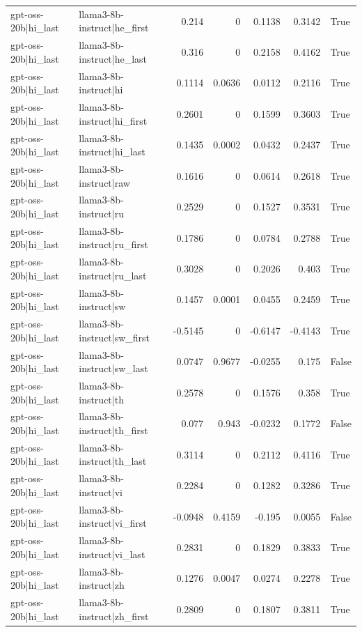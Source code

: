 \begin{table}
\begin{tabular}{l l r r r r l}
gpt-oss-20b|hi_last & llama3-8b-instruct|he_first & 0.214 & 0 & 0.1138 & 0.3142 & True \\
gpt-oss-20b|hi_last & llama3-8b-instruct|he_last & 0.316 & 0 & 0.2158 & 0.4162 & True \\
gpt-oss-20b|hi_last & llama3-8b-instruct|hi & 0.1114 & 0.0636 & 0.0112 & 0.2116 & True \\
gpt-oss-20b|hi_last & llama3-8b-instruct|hi_first & 0.2601 & 0 & 0.1599 & 0.3603 & True \\
gpt-oss-20b|hi_last & llama3-8b-instruct|hi_last & 0.1435 & 0.0002 & 0.0432 & 0.2437 & True \\
gpt-oss-20b|hi_last & llama3-8b-instruct|raw & 0.1616 & 0 & 0.0614 & 0.2618 & True \\
gpt-oss-20b|hi_last & llama3-8b-instruct|ru & 0.2529 & 0 & 0.1527 & 0.3531 & True \\
gpt-oss-20b|hi_last & llama3-8b-instruct|ru_first & 0.1786 & 0 & 0.0784 & 0.2788 & True \\
gpt-oss-20b|hi_last & llama3-8b-instruct|ru_last & 0.3028 & 0 & 0.2026 & 0.403 & True \\
gpt-oss-20b|hi_last & llama3-8b-instruct|sw & 0.1457 & 0.0001 & 0.0455 & 0.2459 & True \\
gpt-oss-20b|hi_last & llama3-8b-instruct|sw_first & -0.5145 & 0 & -0.6147 & -0.4143 & True \\
gpt-oss-20b|hi_last & llama3-8b-instruct|sw_last & 0.0747 & 0.9677 & -0.0255 & 0.175 & False \\
gpt-oss-20b|hi_last & llama3-8b-instruct|th & 0.2578 & 0 & 0.1576 & 0.358 & True \\
gpt-oss-20b|hi_last & llama3-8b-instruct|th_first & 0.077 & 0.943 & -0.0232 & 0.1772 & False \\
gpt-oss-20b|hi_last & llama3-8b-instruct|th_last & 0.3114 & 0 & 0.2112 & 0.4116 & True \\
gpt-oss-20b|hi_last & llama3-8b-instruct|vi & 0.2284 & 0 & 0.1282 & 0.3286 & True \\
gpt-oss-20b|hi_last & llama3-8b-instruct|vi_first & -0.0948 & 0.4159 & -0.195 & 0.0055 & False \\
gpt-oss-20b|hi_last & llama3-8b-instruct|vi_last & 0.2831 & 0 & 0.1829 & 0.3833 & True \\
gpt-oss-20b|hi_last & llama3-8b-instruct|zh & 0.1276 & 0.0047 & 0.0274 & 0.2278 & True \\
gpt-oss-20b|hi_last & llama3-8b-instruct|zh_first & 0.2809 & 0 & 0.1807 & 0.3811 & True \\

\end{tabular}
\end{table}
